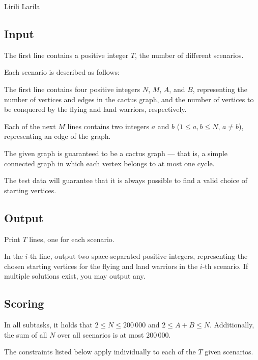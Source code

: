\begin{statement}[
  problempoints=100,
  timelimit=2 seconds,
  memorylimit=512 MiB,
]{Lirili Larila}
\subsection*{Input}

The first line contains a positive integer $T$, the number of different scenarios.

Each scenario is described as follows:

The first line contains four positive integers $N$, $M$, $A$, and $B$, representing 
the number of vertices and edges in the cactus graph, and the number of vertices 
to be conquered by the flying and land warriors, respectively.

Each of the next $M$ lines contains two integers $a$ and $b$ ($1 \leq a, b \leq N$, $a \neq b$),  
representing an edge of the graph.

The given graph is guaranteed to be a cactus graph — that is, a simple connected graph 
in which each vertex belongs to at most one cycle.

The test data will guarantee that it is always possible to find a valid choice of starting vertices.

\subsection*{Output}

Print $T$ lines, one for each scenario.

In the $i$-th line, output two space-separated positive integers,
representing the chosen starting vertices for the flying and land warriors 
in the $i$-th scenario.  
If multiple solutions exist, you may output any.

\subsection*{Scoring}

In all subtasks, it holds that $2 \leq N \leq 200\,000$ and $2 \leq A + B \leq N$.  
Additionally, the sum of all $N$ over all scenarios is at most $200\,000$.

The constraints listed below apply individually to each of the $T$ given scenarios.


\end{statement}
